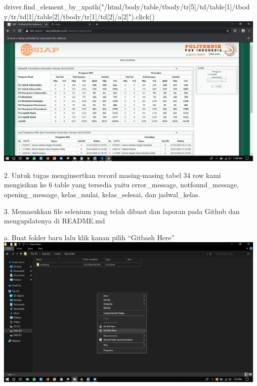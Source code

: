 \documentclass{article}
\begin{document}
            driver.find_element_by_xpath("/html/body/table/tbody/tr[5]/td/table[1]/tbody/tr/td[1]/table[2]/tbody/tr[1]/td[2]/a[2]").click()
            \newline
            \newline
            \includegraphics[scale=0.3]{33.1e.jpg}
            \newline
        \item 2. Untuk tugas menginsertkan record masing-masing tabel 34 row kami mengisikan ke 6 table yang tersedia yaitu error_message, notfound_message, opening_message, kelas_mulai, kelas_selesai, dan jadwal_kelas.
            \newline
            \newline
        \item 3.	Memasukkan file selenium yang telah dibuat dan laporan pada Github dan mengupdatenya di README.md
           \newline
            \item a. Buat folder baru lalu klik kanan pilih “Gitbash Here”	
                \newline
                \includegraphics[scale=0.3]{33.3a.jpg}
\end{document}
